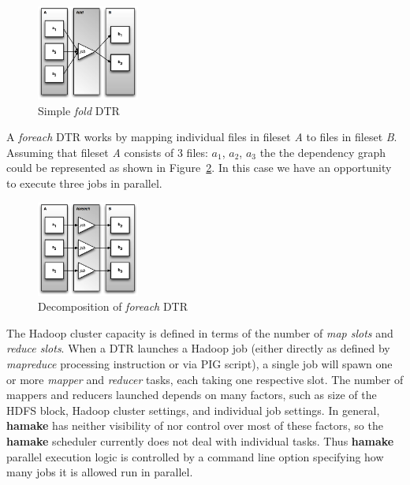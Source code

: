 \documentclass[10pt,conference,letterpaper]{IEEEtran}
\begin{document}
\begin{figure}[htp]
\centering
\includegraphics[width=0.3\textwidth]{twofoldp.eps}
\caption{Simple \emph{fold} DTR}
\label{fig:fold2}
\end{figure}

A \emph{foreach} DTR works by mapping individual files in fileset
\textit{A} to files in fileset \textit{B}. Assuming that fileset
\textit{A} consists of 3 files: \textit{$a_1$}, \textit{$a_2$},
\textit{$a_3$} the the dependency graph could be represented as shown
in Figure~\ref{fig:foreach2}. In this case we have an opportunity to
execute three jobs in parallel.

\begin{figure}[htp]
\centering
\includegraphics[width=0.3\textwidth]{twoforeachp.eps}
\caption{Decomposition of \emph{foreach} DTR}
\label{fig:foreach2}
\end{figure}

The Hadoop cluster capacity is defined in terms of the number of
\textit{map slots} and \textit{reduce slots}. When a DTR launches a Hadoop job
(either directly as defined by \emph{mapreduce} processing instruction
or via PIG script), a single job will spawn one or more \emph{mapper}
and \emph{reducer} tasks, each taking one respective slot. The number of
mappers and reducers launched depends on many factors, such as size of the
HDFS block, Hadoop cluster settings, and individual job settings. In
general, \textbf{hamake} has neither visibility of nor
control over most of these factors, so the \textbf{hamake} scheduler
currently does not deal with individual tasks. Thus \textbf{hamake}
parallel execution logic is controlled by a command line option
specifying how many jobs it is allowed run in parallel.
\end{document}
